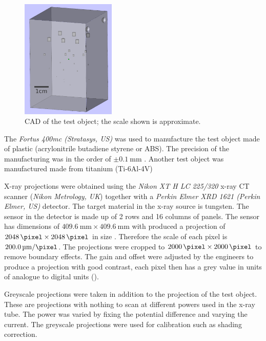 \begin{figure}
  \centering
  \includegraphics[width=0.4\textwidth]{../figures/inference/TestObject.png}
  \caption{CAD of the test object; the scale shown is approximate.}
  \label{fig:inference_testObject}
\end{figure}

The \emph{Fortus 400mc (Stratasys, US)} was used to manufacture the test object made of plastic (acrylonitrile butadiene styrene or ABS). The precision of the manufacturing was in the order of $\pm\SI{0.1}{\milli\metre}$ \citep{hanseen2013fortus}. Another test object was manufactured made from titanium (Ti-6Al-4V)

X-ray projections were obtained using the \emph{Nikon XT H LC 225/320} x-ray CT scanner (\emph{Nikon Metrology, UK}) together with a \emph{Perkin Elmer XRD 1621 (Perkin Elmer, US)} detector. The target material in the x-ray source is tungsten. The sensor in the detector is made up of 2 rows and 16 columns of panels. The sensor has dimensions of $\SI{409.6}{\milli\metre}\times\SI{409.6}{\milli\metre}$ with produced a projection of $\SI{2048}{\pixel}\times\SI{2048}{\pixel}$ in size \citep{perkinelmer2006xrd}. Therefore the scale of each pixel is $\SI{200.0}{\micro\metre\per\pixel}$. The projections were cropped to $\SI{2000}{\pixel}\times\SI{2000}{\pixel}$ to remove boundary effects. The gain and offset were adjusted by the engineers to produce a projection with good contrast, each pixel then has a grey value in units of analogue to digital units (\SI{}{\adu}).

Greyscale projections were taken in addition to the projection of the test object. These are projections with nothing to scan at different powers used in the x-ray tube. The power was varied by fixing the potential difference and varying the current. The greyscale projections were used for calibration such as shading correction.

